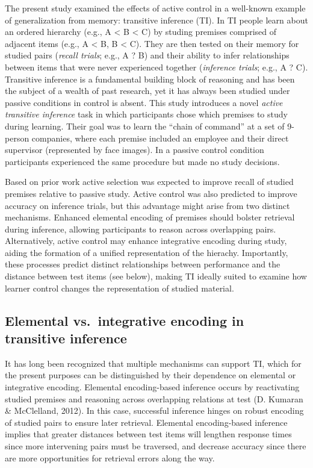 \documentclass[floatsintext,man]{apa6}
\theoremstyle{definition}
\theoremstyle{definition}
\theoremstyle{definition}
\theoremstyle{remark}
\begin{document}
The present study examined the effects of active control in a well-known
example of generalization from memory: transitive inference (TI). In TI
people learn about an ordered hierarchy (e.g., A \textless{} B
\textless{} C) by studing premises comprised of adjacent items (e.g., A
\textless{} B, B \textless{} C). They are then tested on their memory
for studied pairs (\emph{recall trials}; e.g., A ? B) and their ability
to infer relationships between items that were never experienced
together (\emph{inference trials}; e.g., A ? C). Transitive inference is
a fundamental building block of reasoning and has been the subject of a
wealth of past research, yet it has always been studied under passive
conditions in control is absent. This study introduces a novel
\emph{active transitive inference} task in which participants chose
which premises to study during learning. Their goal was to learn the
\enquote{chain of command} at a set of 9-person companies, where each
premise included an employee and their direct supervisor (represented by
face images). In a passive control condition participants experienced
the same procedure but made no study decisions.

Based on prior work active selection was expected to improve recall of
studied premises relative to passive study. Active control was also
predicted to improve accuracy on inference trials, but this advantage
might arise from two distinct mechanisms. Enhanced elemental encoding of
premises should bolster retrieval during inference, allowing
participants to reason across overlapping pairs. Alternatively, active
control may enhance integrative encoding during study, aiding the
formation of a unified representation of the hierachy. Importantly,
these processes predict distinct relationships between performance and
the distance between test items (see below), making TI ideally suited to
examine how learner control changes the representation of studied
material.

\subsection{Elemental vs.~integrative encoding in transitive
inference}\label{elemental-vs.integrative-encoding-in-transitive-inference}

It has long been recognized that multiple mechanisms can support TI,
which for the present purposes can be distinguished by their dependence
on elemental or integrative encoding. Elemental encoding-based inference
occurs by reactivating studied premises and reasoning across overlapping
relations at test (D. Kumaran \& McClelland, 2012). In this case,
successful inference hinges on robust encoding of studied pairs to
ensure later retrieval. Elemental encoding-based inference implies that
greater distances between test items will lengthen response times since
more intervening pairs must be traversed, and decrease accuracy since
there are more opportunities for retrieval errors along the way.
\end{document}
